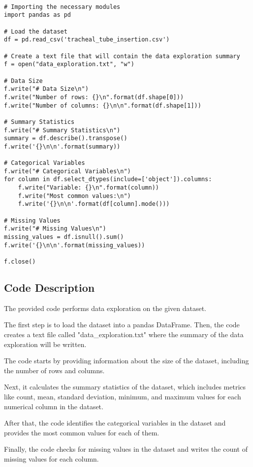 \documentclass[11pt]{article}
\begin{document}
\begin{verbatim}

# Importing the necessary modules
import pandas as pd

# Load the dataset
df = pd.read_csv('tracheal_tube_insertion.csv')

# Create a text file that will contain the data exploration summary
f = open("data_exploration.txt", "w")

# Data Size
f.write("# Data Size\n")
f.write("Number of rows: {}\n".format(df.shape[0]))
f.write("Number of columns: {}\n\n".format(df.shape[1]))

# Summary Statistics
f.write("# Summary Statistics\n")
summary = df.describe().transpose()
f.write('{}\n\n'.format(summary))

# Categorical Variables
f.write("# Categorical Variables\n")
for column in df.select_dtypes(include=['object']).columns:
    f.write("Variable: {}\n".format(column))
    f.write("Most common values:\n")
    f.write('{}\n\n'.format(df[column].mode()))

# Missing Values
f.write("# Missing Values\n")
missing_values = df.isnull().sum()
f.write('{}\n\n'.format(missing_values))

f.close()

\end{verbatim}

\subsection{Code Description}

The provided code performs data exploration on the given dataset. 

The first step is to load the dataset into a pandas DataFrame. Then, the code creates a text file called "data\_exploration.txt" where the summary of the data exploration will be written.

The code starts by providing information about the size of the dataset, including the number of rows and columns.

Next, it calculates the summary statistics of the dataset, which includes metrics like count, mean, standard deviation, minimum, and maximum values for each numerical column in the dataset.

After that, the code identifies the categorical variables in the dataset and provides the most common values for each of them.

Finally, the code checks for missing values in the dataset and writes the count of missing values for each column.
\end{document}
